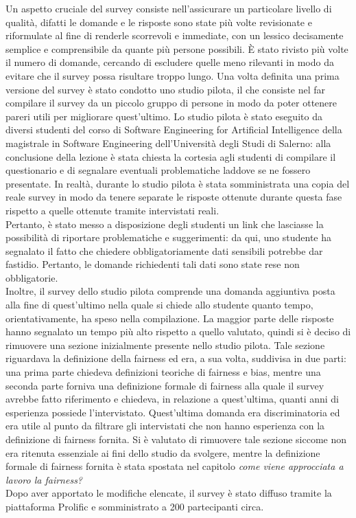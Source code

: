 Un aspetto cruciale del survey consiste nell'assicurare un particolare livello di qualità, difatti le domande e le risposte sono state più volte revisionate e riformulate al fine di renderle scorrevoli e immediate, con un lessico decisamente semplice e comprensibile da quante più persone possibili. È stato rivisto più volte il numero di domande, cercando di escludere quelle meno rilevanti in modo da evitare che il survey possa risultare troppo lungo. Una volta definita una prima versione del survey è stato condotto uno studio pilota, il che consiste nel far compilare il survey da un piccolo gruppo di persone in modo da poter ottenere pareri utili per migliorare quest'ultimo. Lo studio pilota è stato eseguito da diversi studenti del corso di Software Engineering for Artificial Intelligence della magistrale in Software Engineering dell'Università degli Studi di Salerno: alla conclusione della lezione è stata chiesta la cortesia agli studenti di compilare il questionario e di segnalare eventuali problematiche laddove se ne fossero presentate. In realtà, durante lo studio pilota è stata somministrata una copia del reale survey in modo da tenere separate le risposte ottenute durante questa fase rispetto a quelle ottenute tramite intervistati reali.\\
Pertanto, è stato messo a disposizione degli studenti un link che lasciasse la possibilità di riportare problematiche e suggerimenti: da qui, uno studente ha segnalato il fatto che chiedere obbligatoriamente dati sensibili potrebbe dar fastidio. Pertanto, le domande richiedenti tali dati sono state rese non obbligatorie.\\
Inoltre, il survey dello studio pilota comprende una domanda aggiuntiva posta alla fine di quest'ultimo nella quale si chiede allo studente quanto tempo, orientativamente, ha speso nella compilazione. La maggior parte delle risposte hanno segnalato un tempo più alto rispetto a quello valutato, quindi si è deciso di rimuovere una sezione inizialmente presente nello studio pilota. Tale sezione riguardava la definizione della fairness ed era, a sua volta, suddivisa in due parti: una prima parte chiedeva definizioni teoriche di fairness e bias, mentre una seconda parte forniva una definizione formale di fairness alla quale il survey avrebbe fatto riferimento e chiedeva, in relazione a quest'ultima, quanti anni di esperienza possiede l'intervistato. Quest'ultima domanda era discriminatoria ed era utile al punto da filtrare gli intervistati che non hanno esperienza con la definizione di fairness fornita. Si è valutato di rimuovere tale sezione siccome non era ritenuta essenziale ai fini dello studio da svolgere, mentre la definizione formale di fairness fornita è stata spostata nel capitolo \emph{come viene approcciata a lavoro la fairness?}\\
Dopo aver apportato le modifiche elencate, il survey è stato diffuso tramite la piattaforma Prolific e somministrato a 200 partecipanti circa.

